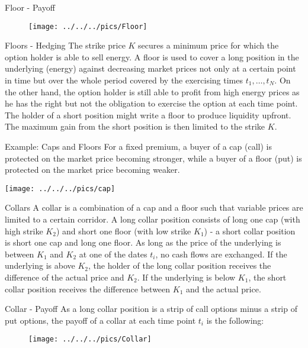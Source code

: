 {Floor - Payoff}
\begin{figure}
	\centering
		\texttt{[image: ../../../pics/Floor]}
	\label{fig:Floor}
\end{figure}



{Floors - Hedging}
The strike price $K$ secures a minimum price for which the option holder is able to sell energy. A floor is used to cover a long position in the underlying (energy) against decreasing market prices not only at a certain point in time but over the whole period covered by the exercising times $t_1,\ldots,t_N$.
On the other hand, the option holder is still able to profit from high energy prices as he has the right but not the obligation to exercise the option at each time point. \\
The holder of a short position might write a floor to produce liquidity upfront. The maximum gain from the short position is then limited to the strike $K$.



{Example: Caps and Floors}
For a fixed premium, a buyer of a cap (call) is protected on the market price becoming stronger, while a buyer of a floor (put) is protected on the market price becoming weaker.\\
\begin{center}
\texttt{[image: ../../../pics/cap]}
\end{center}



{Collars}
A collar is a combination of a cap and a floor such that variable prices are limited to a certain corridor. A long collar position consists of long one cap (with high strike $K_2$) and short one floor (with low strike $K_1$) - a short collar position is short one cap and long one floor. As long as the price of the underlying is between $K_1$ and $K_2$ at one of the dates $t_i$, no cash flows are exchanged. If the underlying is above $K_2$, the holder of the long collar position receives the difference of the actual price and $K_2$. If the underlying is below $K_1$, the short collar position receives the difference between $K_1$ and the actual price.



{Collar - Payoff}
As a long collar position is a strip of call options minus a strip of put options, the payoff of a collar at each time point $t_i$ is the following:
\begin{figure}
	\centering
		\texttt{[image: ../../../pics/Collar]}
	\label{fig:Collar}
\end{figure}



